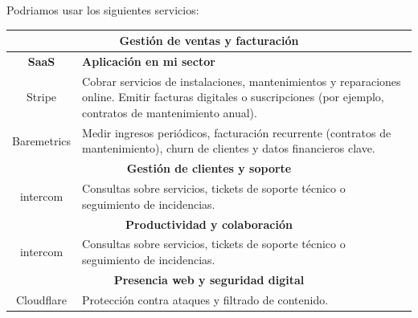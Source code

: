 

\begin{solution}
Podriamos usar los siguientes servicios:

	\begin{center}
	
	\begin{tabular}{|c|p{10cm}|}
		\hline
		\multicolumn{2}{|c|}{\textbf{Gestión de ventas y facturación}}\\
		\hline
		\textbf{SaaS} & \textbf{Aplicación en mi sector}  \\
		\hline
		Stripe & Cobrar servicios de instalaciones, mantenimientos y reparaciones online. Emitir facturas digitales o suscripciones (por ejemplo, contratos de mantenimiento anual). \\
		\hline
		Baremetrics & Medir ingresos periódicos, facturación recurrente (contratos de mantenimiento), churn de clientes y datos financieros clave. \\
		\hline
		\multicolumn{2}{|c|}{\textbf{Gestión de clientes y soporte}}\\
		\hline
		intercom & Consultas sobre servicios, tickets de soporte técnico o seguimiento de incidencias. \\
		\hline
		\multicolumn{2}{|c|}{\textbf{Productividad y colaboración}}\\
		\hline
		intercom & Consultas sobre servicios, tickets de soporte técnico o seguimiento de incidencias. \\
		\hline
		\multicolumn{2}{|c|}{\textbf{Presencia web y seguridad digital}}\\
		\hline
		Cloudflare & Protección contra ataques y filtrado de contenido. \\
		\hline
	\end{tabular} 
	\end{center}

\end{solution}
